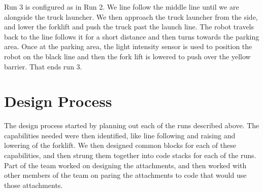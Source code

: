 \documentclass[letter, article]{article}
\begin{document}
Run 3 is configured as in Run 2.  We line follow the middle line until we are alongside the truck launcher.  We then approach the truck launcher from the side, and lower the forklift and push the truck past the launch line.  The robot travels back to the line follows it for a short distance and then turns towards the parking area.  Once at the parking area, the light intensity sensor is used to position the robot on the black line and then the fork lift is lowered to push over the yellow barrier.  That ends run 3.

\section{Design Process}

The design process started by planning out each of the runs described above.  The capabilities needed were then identified, like line following and raising and lowering of the forklift. We then designed common blocks for each of these capabilities, and then strung them together into code stacks for each of the runs.  Part of the team worked on designing the attachments, and then worked with other members of the team on paring the attachments to code that would use those attachments.
\end{document}

